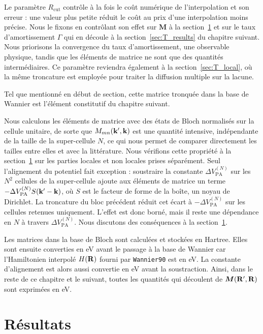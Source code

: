 Le paramètre $R_\text{cut}$ contrôle à la fois le coût numérique de l'interpolation et son erreur : une valeur plus petite réduit le coût au prix d'une interpolation moins précise. Nous le fixons en contrôlant son effet sur $\bm M$ à la section~\ref{sec:M_results} et sur le taux d'amortissement $\Gamma$ qui en découle à la section~\ref{sec:T_results} du chapitre suivant. Nous priorisons la convergence du taux d'amortissement, une observable physique, tandis que les éléments de matrice ne sont que des quantités intermédiaires. Ce paramètre reviendra également à la section~\ref{sec:T_local}, où la même troncature est employée pour traiter la diffusion multiple sur la lacune.

Tel que mentionné en début de section, cette matrice tronquée dans la base de Wannier est l'élément constitutif du chapitre suivant.

\bigskip
{}

Nous calculons les éléments de matrice avec des états de Bloch normalisés sur la cellule unitaire, de sorte que $M_{mn}(\mathbf{k}',\mathbf{k})$ est une quantité intensive, indépendante de la taille de la super-cellule $N$, ce qui nous permet de comparer directement les tailles entre elles et avec la littérature. Nous vérifions cette propriété à la section~\ref{sec:M_results} sur les parties locales et non locales prises séparément. Seul l'alignement du potentiel fait exception : soustraire la constante $\Delta V_\text{PA}^{(N)}$ sur les $N^2$ cellules de la super-cellule ajoute aux éléments de matrice un terme $-\Delta V_\text{PA}^{(N)}S(\mathbf{k}'-\mathbf{k})$, où $S$ est le facteur de forme de la boîte, un noyau de Dirichlet. La troncature du bloc précédent réduit cet écart à $-\Delta V_\text{PA}^{(N)}$ sur les cellules retenues uniquement. L'effet est donc borné, mais il reste une dépendance en $N$ à travers $\Delta V_\text{PA}^{(N)}$. Nous discutons des conséquences à la section~\ref{sec:M_results}.

Les matrices dans la base de Bloch sont calculées et stockées en Hartree. Elles sont ensuite converties en eV avant le passage à la base de Wannier car l'Hamiltonien interpolé $H(\mathbf{R})$ fourni par \texttt{Wannier90} est en eV. La constante d'alignement est alors aussi convertie en eV avant la soustraction. Ainsi, dans le reste de ce chapitre et le suivant, toutes les quantités qui découlent de $\bm M(\mathbf{R}',\mathbf{R})$ sont exprimées en eV.

\section{Résultats}\label{sec:M_results}

